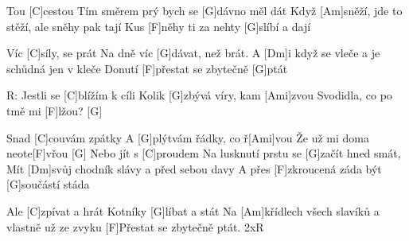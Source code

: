 
Tou [C]cestou Tím směrem prý bych se [G]dávno měl dát 
Když [Am]sněží, jde to stěží, ale sněhy pak tají 
Kus [F]něhy ti za nehty [G]slíbí a dají

Víc [C]síly, se prát
Na dně víc [G]dávat, než brát.
A [Dm]i když se vleče a je schůdná jen v kleče
Donutí [F]přestat se zbytečně [G]ptát

R: Jestli se [C]blížím k cíli
Kolik [G]zbývá víry, kam [Ami]zvou
Svodidla, co po tmě mi [F]lžou? [G]

Snad [C]couvám zpátky
A [G]plýtvám řádky, co ř[Ami]vou
Že už mi doma neote[F]vřou [G]
\slpc
Nebo jít s [C]proudem
Na lusknutí prstu se [G]začít hned smát, 
Mít [Dm]svůj chodník slávy a před sebou davy 
A přes [F]zkroucená záda být [G]součástí stáda

Ale [C]zpívat a hrát
Kotníky [G]líbat a stát
Na [Am]křídlech všech slavíků a vlastně už ze zvyku
[F]Přestat se zbytečně ptát. 2xR


